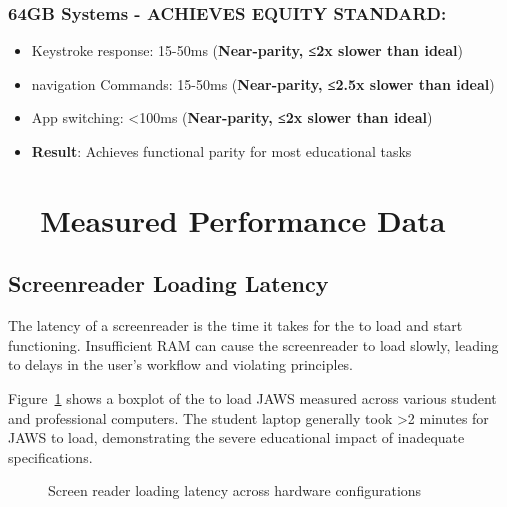 \subsubsection{64GB Systems - ACHIEVES EQUITY STANDARD:}

\begin{itemize}
    \item Keystroke response: 15-50ms (\textbf{Near-parity, ≤2x slower than ideal})
    \item \Gls{navigation} Commands: 15-50ms (\textbf{Near-parity, ≤2.5x slower than ideal})
    \item App switching: <100ms (\textbf{Near-parity, ≤2x slower than ideal})
    \item \textbf{Result}: Achieves functional parity for most educational tasks \supercite{EducationalEquityReport2024}
\end{itemize}

\hypertarget{measured-performance-data}{}\section{~~Measured Performance Data}\label{measured-performance-data}

\subsection{Screenreader Loading Latency}\label{screenreader-loading-latency}

The latency of a screenreader is the time it takes for the  to load and start functioning. Insufficient RAM can cause the screenreader to load slowly, leading to delays in the user's workflow and violating  principles.

Figure~\ref{fig:figure1} shows a boxplot of the  to load JAWS measured across various student and professional computers. The student laptop generally took >2 minutes for JAWS to load, demonstrating the severe educational impact of inadequate  specifications.

\begin{figure}[htbp]
	\centering
	\caption{Screen reader loading latency across hardware configurations}
	\label{fig:figure1}
\end{figure}

